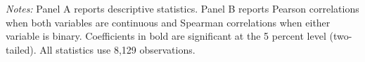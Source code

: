 \begin{landscape}
\begin{table}[p]
{\begin{tabular}{lrrrrrrrrrrrrrrrrr}

\\\hline
\end{tabular}}
\vspace{3pt}
\begin{minipage}{0.98\linewidth}\footnotesize\textit{Notes:} Panel A reports descriptive statistics. Panel B reports Pearson correlations when both variables are continuous and Spearman correlations when either variable is binary. Coefficients in bold are significant at the 5 percent level (two-tailed). All statistics use 8,129 observations.\end{minipage}
\end{table}
\end{landscape}
